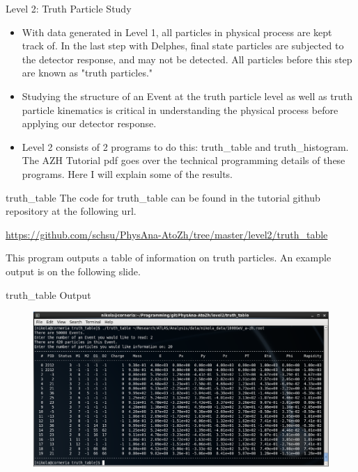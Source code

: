 \documentclass{beamer}
\begin{document}
	\begin{frame}{Level 2: Truth Particle Study}
		\begin{itemize}
\item<1->With data generated in Level 1, all particles in physical process are kept track of. In the last step with Delphes, final state particles are subjected to the detector response, and may not be detected. All particles before this step are known as "truth particles."

\bigskip

\item<1->Studying the structure of an Event at the truth particle level as well as truth particle kinematics is critical in understanding the physical process before applying our detector response.

\bigskip

\item<1->Level 2 consists of 2 programs to do this: truth\_table and truth\_histogram. The AZH Tutorial pdf goes over the technical programming details of these programs. Here I will explain some of the results.
		\end{itemize}
	\end{frame}
	\begin{frame}{truth\_table}
The code for truth\_table can be found in the tutorial github repository at the following url.

\bigskip

\url{https://github.com/schsu/PhysAna-AtoZh/tree/master/level2/truth_table}

\bigskip

This program outputs a table of information on truth particles. An example output is on the following slide.
	\end{frame}
	\begin{frame}{truth\_table Output}
		\begin{figure}
			\centering
			\includegraphics[width = \linewidth]{truth_table_output.eps}
		\end{figure}
	\end{frame}
\end{document}

